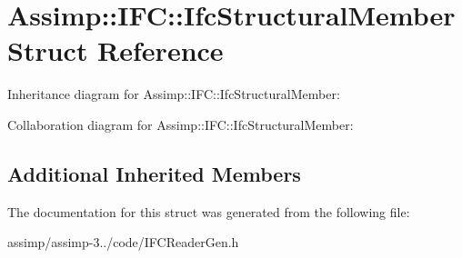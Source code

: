 \hypertarget{struct_assimp_1_1_i_f_c_1_1_ifc_structural_member}{\section{Assimp\+:\+:I\+F\+C\+:\+:Ifc\+Structural\+Member Struct Reference}
\label{struct_assimp_1_1_i_f_c_1_1_ifc_structural_member}
}


Inheritance diagram for Assimp\+:\+:I\+F\+C\+:\+:Ifc\+Structural\+Member\+:


Collaboration diagram for Assimp\+:\+:I\+F\+C\+:\+:Ifc\+Structural\+Member\+:
\subsection*{Additional Inherited Members}


The documentation for this struct was generated from the following file\+:\begin{DoxyCompactItemize}
\item 
assimp/assimp-\/3../code/I\+F\+C\+Reader\+Gen.\+h\end{DoxyCompactItemize}
